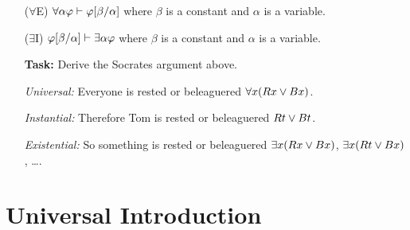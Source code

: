 \documentclass[a4paper, 11pt]{article} %
\begin{document}
\begin{enumerate}
  \item[($\forall$E)] $\forall\alpha\varphi \vdash \varphi[\beta/\alpha]$ where $\beta$ is a constant and $\alpha$ is a variable. 
  \item[($\exists$I)] $\varphi[\beta/\alpha] \vdash \exists\alpha\varphi$ where $\beta$ is a constant and $\alpha$ is a variable. 
  \item[\bf Task:] Derive the Socrates argument above.
  \item[\it Universal:] Everyone is rested or beleaguered $\forall x(Rx \vee Bx)$.
  \item[\it Instantial:] Therefore Tom is rested or beleaguered $Rt \vee Bt$.
  \item[\it Existential:] So something is rested or beleaguered $\exists x(Rx \vee Bx)$, $\exists x(Rt \vee Bx)$, \ldots.
\end{enumerate}






\section*{Universal Introduction}
\end{document}
